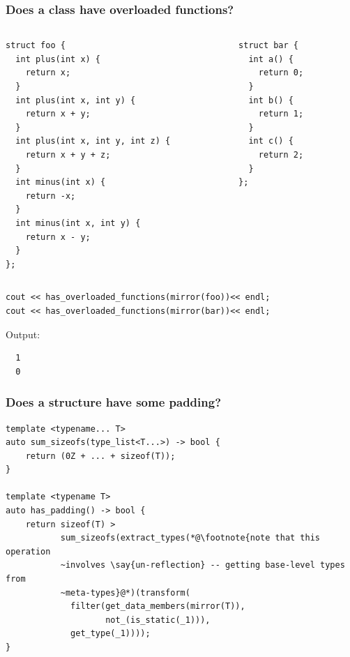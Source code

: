 \documentclass[compress,table,xcolor=table]{beamer}
\begin{document}
\begin{frame}[fragile]
  \frametitle{Does a class have overloaded functions?}
  \begin{columns}
    \begin{column}{.50\textwidth}
      \begin{lstlisting}[language=c++2x,basicstyle=\tiny\ttfamily]
struct foo {
  int plus(int x) {
    return x;
  }
  int plus(int x, int y) {
    return x + y;
  }
  int plus(int x, int y, int z) {
    return x + y + z;
  }
  int minus(int x) {
    return -x;
  }
  int minus(int x, int y) {
    return x - y;
  }
};
      \end{lstlisting}
    \end{column}
    \begin{column}{.40\textwidth}
      \begin{lstlisting}[language=c++2x,basicstyle=\scriptsize\ttfamily]
struct bar {
  int a() {
    return 0;
  }
  int b() {
    return 1;
  }
  int c() {
    return 2;
  }
};
      \end{lstlisting}
    \end{column}
  \end{columns}
  \begin{lstlisting}[language=c++2x,basicstyle=\footnotesize\ttfamily]
cout << has_overloaded_functions(mirror(foo))<< endl;
cout << has_overloaded_functions(mirror(bar))<< endl;
  \end{lstlisting}
  Output:
  \begin{verbatim}
  1
  0
  \end{verbatim}
\end{frame}
\begin{frame}[fragile]
  \frametitle{Does a structure have some padding?}
  \begin{lstlisting}[language=c++2x,basicstyle=\footnotesize\ttfamily]
template <typename... T>
auto sum_sizeofs(type_list<T...>) -> bool {
    return (0Z + ... + sizeof(T));
}

template <typename T>
auto has_padding() -> bool {
    return sizeof(T) >
           sum_sizeofs(extract_types(*@\footnote{note that this operation 
           ~involves \say{un-reflection} -- getting base-level types from
           ~meta-types}@*)(transform(
             filter(get_data_members(mirror(T)),
                    not_(is_static(_1))),
             get_type(_1))));
}
  \end{lstlisting}
\end{frame}
\end{document}
